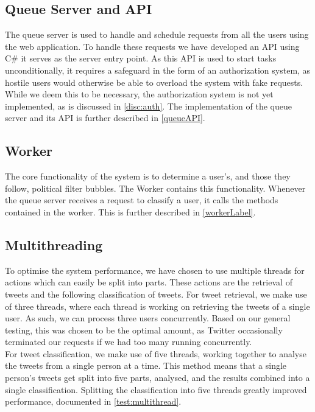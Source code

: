 \subsection{Queue Server and API}
The queue server is used to handle and schedule requests from all the users
using the web application. To handle these requests we have developed an API
using C\# it serves as the server entry point. As this API is used to start
tasks unconditionally, it requires a safeguard in the form of an authorization
system, as hostile users would otherwise be able to overload the system with
fake requests. While we deem this to be necessary, the authorization system is
not yet implemented, as is discussed in \autoref{disc:auth}. The implementation
of the queue server and its API is further described in \autoref{queueAPI}.

\subsection{Worker}
The core functionality of the system is to determine a user's, and those they
follow, political filter bubbles. The Worker contains this functionality.
Whenever the queue server receives a request to classify a user, it calls the
methods contained in the worker. This is further described in
\autoref{workerLabel}.

\subsection{Multithreading}\label{subs:multithread}
To optimise the system performance, we have chosen to use multiple threads for
actions which can easily be split into parts. These actions are the retrieval of
tweets and the following classification of tweets. For tweet retrieval, we make
use of three threads, where each thread is working on retrieving the tweets of a
single user. As such, we can process three users concurrently. Based on our
general testing, this was chosen to be the optimal amount, as Twitter
occasionally terminated our requests if we had too many running concurrently.\\
For tweet classification, we make use of five threads, working together to
analyse the tweets from a single person at a time. This method means that a
single person's tweets get split into five parts, analysed, and the results
combined into a single classification. Splitting the classification into five
threads greatly improved performance, documented in \autoref{test:multithread}.


